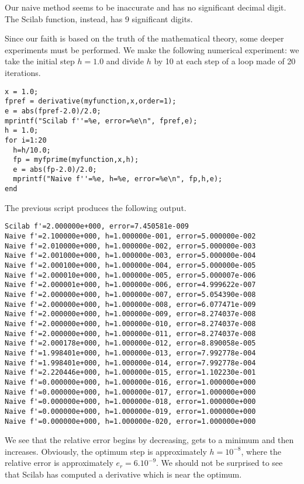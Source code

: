 Our naive method seems to be inaccurate and has no 
significant decimal digit. The Scilab function, instead, 
has 9 significant digits.

Since our faith is based on the truth of the mathematical
theory, some deeper experiments must be performed.
We make the following numerical experiment: we take 
the initial step $h=1.0$ and divide $h$ by 10 at each
step of a loop made of 20 iterations.
\lstset{language=scilabscript}
\begin{lstlisting}
x = 1.0;
fpref = derivative(myfunction,x,order=1);
e = abs(fpref-2.0)/2.0;
mprintf("Scilab f''=%e, error=%e\n", fpref,e);
h = 1.0;
for i=1:20
  h=h/10.0;
  fp = myfprime(myfunction,x,h);
  e = abs(fp-2.0)/2.0;
  mprintf("Naive f''=%e, h=%e, error=%e\n", fp,h,e);
end
\end{lstlisting}

The previous script produces the following output.
\begin{lstlisting}
Scilab f'=2.000000e+000, error=7.450581e-009
Naive f'=2.100000e+000, h=1.000000e-001, error=5.000000e-002
Naive f'=2.010000e+000, h=1.000000e-002, error=5.000000e-003
Naive f'=2.001000e+000, h=1.000000e-003, error=5.000000e-004
Naive f'=2.000100e+000, h=1.000000e-004, error=5.000000e-005
Naive f'=2.000010e+000, h=1.000000e-005, error=5.000007e-006
Naive f'=2.000001e+000, h=1.000000e-006, error=4.999622e-007
Naive f'=2.000000e+000, h=1.000000e-007, error=5.054390e-008
Naive f'=2.000000e+000, h=1.000000e-008, error=6.077471e-009
Naive f'=2.000000e+000, h=1.000000e-009, error=8.274037e-008
Naive f'=2.000000e+000, h=1.000000e-010, error=8.274037e-008
Naive f'=2.000000e+000, h=1.000000e-011, error=8.274037e-008
Naive f'=2.000178e+000, h=1.000000e-012, error=8.890058e-005
Naive f'=1.998401e+000, h=1.000000e-013, error=7.992778e-004
Naive f'=1.998401e+000, h=1.000000e-014, error=7.992778e-004
Naive f'=2.220446e+000, h=1.000000e-015, error=1.102230e-001
Naive f'=0.000000e+000, h=1.000000e-016, error=1.000000e+000
Naive f'=0.000000e+000, h=1.000000e-017, error=1.000000e+000
Naive f'=0.000000e+000, h=1.000000e-018, error=1.000000e+000
Naive f'=0.000000e+000, h=1.000000e-019, error=1.000000e+000
Naive f'=0.000000e+000, h=1.000000e-020, error=1.000000e+000
\end{lstlisting}

We see that the relative error begins by decreasing, gets to a minimum 
and then increases. Obviously, the optimum step is approximately $h=10^{-8}$, where the
relative error is approximately $e_r=6.10^{-9}$. 
We should not be surprised to see that Scilab has computed 
a derivative which is near the optimum.

